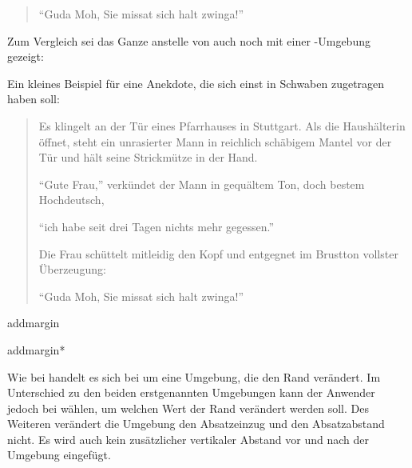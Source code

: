 \begin{Example}
\begin{ShowOutput}
\begin{quotation}
            "`Guda Moh, Sie missat sich halt zwinga!"'
          \end{quotation}
        \end{ShowOutput}%
        Zum Vergleich sei das Ganze anstelle von  auch
        noch mit einer -Umgebung gezeigt:%
        \begin{ShowOutput}
          \iftrue%
            Ein kleines Beispiel für eine Anekdote, die sich einst
            in Schwaben zugetragen haben soll:
          \fi
          \begin{quote}\setlength{\parskip}{4pt plus 2pt minus 2pt}
            Es klingelt an der Tür eines Pfarrhauses in Stuttgart. Als die
            Haushälterin öffnet, steht ein unrasierter Mann in reichlich
            schäbigem Mantel vor der Tür und hält seine Strickmütze in der Hand.

            "`Gute Frau,"' verkündet der Mann in gequältem Ton, doch bestem
            Hochdeutsch, 
            \iffalse%
              während er verlegen von einem Bein auf das andere wechselt,
            \fi
            "`ich habe seit drei Tagen nichts mehr gegessen."'

            Die Frau schüttelt mitleidig den Kopf und entgegnet im Brustton
            vollster Überzeugung:

            "`Guda Moh, Sie missat sich halt zwinga!"'
          \end{quote}
        \end{ShowOutput}
      \end{Example}%
    \fi
    \EndIndexGroup
\fi

\begin{Declaration}
  \begin{Environment}{addmargin}
  \end{Environment}
  \begin{Environment}{addmargin*}
  \end{Environment}
\end{Declaration}
Wie bei %
handelt es sich bei
 um eine Umgebung, die den Rand
verändert. Im Unterschied zu den beiden erstgenannten Umgebungen kann der
Anwender jedoch bei  wählen, um welchen Wert der Rand
verändert werden soll. Des Weiteren verändert die Umgebung den Absatzeinzug
und den Absatzabstand nicht. Es wird auch kein zusätzlicher vertikaler Abstand
vor und nach der Umgebung eingefügt.

